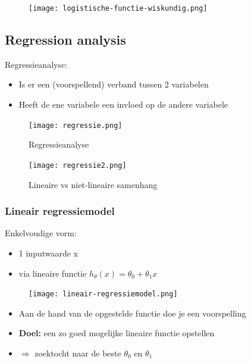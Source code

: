 \documentclass{article}
\begin{document}
\begin{figure}[H]
    \centering
    \texttt{[image: logistische-functie-wiskundig.png]}
    \caption{}
\end{figure}

\subsection{Regression analysis}

Regressieanalyse:

\begin{itemize}
    \item Is er een (voorspellend) verband tussen 2 variabelen
    \item Heeft de ene variabele een invloed op de andere variabele
\end{itemize}

\begin{figure}[H]
    \centering
    \texttt{[image: regressie.png]}
    \caption{Regressieanalyse}
\end{figure}

\begin{figure}[H]
    \centering
    \texttt{[image: regressie2.png]}
    \caption{Lineaire vs niet-lineaire samenhang}
\end{figure}


\subsubsection{Lineair regressiemodel}

Enkelvoudige vorm: 

\begin{itemize}
    \item 1 inputwaarde x
    \item via lineaire functie $h_{\theta}(x) = \theta_0 + \theta_1x$
\end{itemize}

\begin{figure}[H]
    \centering
    \texttt{[image: lineair-regressiemodel.png]}
    \caption{}
\end{figure}

\begin{itemize}
    \item Aan de hand van de opgestelde functie doe je een voorspelling
    \item \textbf{Doel:} een zo goed mogelijke lineaire functie opstellen
    \item $\Rightarrow$ zoektocht naar de beste $\theta_0$ en $\theta_1$
\end{itemize}
\end{document}
